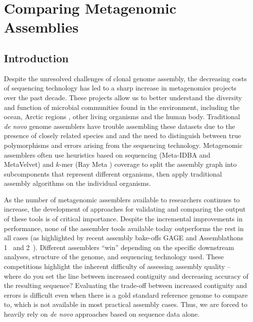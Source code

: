 \documentclass[12pt,\mydriver]{thesis}
\begin{document}
\clearpage{}
\clearpage{}
\renewcommand{\thechapter}{3}

\chapter{Comparing Metagenomic Assemblies}

\section{Introduction}

Despite the unresolved challenges of clonal genome assembly, the decreasing costs of sequencing technology has led to a sharp increase in metagenomics projects over the past decade.
These projects allow us to better understand the diversity and function of microbial communities found in the environment, including the ocean\cite{rusch2007sorcerer,wu2011stalking,yooseph2007sorcerer}, Arctic regions \cite{varin2012metagenomic}, other living organisms\cite{he2013comparative} and the human body\cite{gill2006metagenomic,peterson2009nih}.
Traditional \emph{de novo} genome assemblers have trouble assembling these datasets due to the presence of closely related species and and the need to distinguish between true polymorphisms and errors arising from the sequencing technology.
Metagenomic assemblers often use heuristics based on sequencing (Meta-IDBA \cite{peng2011meta} and MetaVelvet\cite{namiki2012metavelvet}) and $k$-mer (Ray Meta \cite{boisvert2012ray}) coverage to split the assembly graph into subcomponents that represent different organisms, then apply traditional assembly algorithms on the individual organisms.

As the number of metagenomic assemblers available to researchers continues to increase, the development of approaches for validating and comparing the output of these tools is of critical importance.
Despite the incremental improvements in performance, none of the assembler tools available today outperforms the rest in all cases (as highlighted by recent assembly
bake-offs GAGE\cite{salzberg2011gage} and Assemblathons 1~\cite{earl2011assemblathon} and 2~\cite{bradnam2013assemblathon}).
Different assemblers ``win'' depending on the specific downstream analyses, structure of the genome, and sequencing technology used.
These competitions highlight the inherent difficulty of assessing assembly quality -- where do you set the line between increased contiguity and decreasing accuracy of the resulting sequence?
Evaluating the trade-off between increased contiguity and errors is difficult even when there is a gold standard reference genome to compare to, which is not available in most practical assembly cases.
Thus, we are forced to heavily rely on \emph{de novo} approaches based on sequence data alone.
\end{document}
